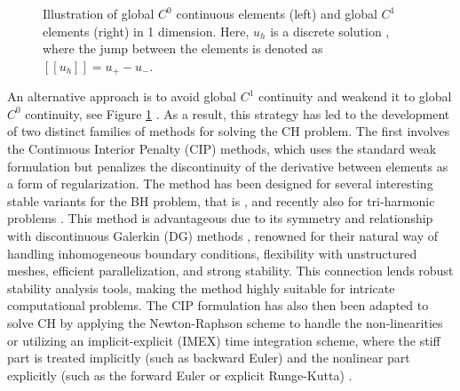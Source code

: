 \documentclass[11pt]{article}
\theoremstyle{remark}
\newcommand{\jump}[1]{\left[\!\left[ #1 \right]\!\right]}
\numberwithin{equation}{section}
\begin{document}
\begin{figure}[h!]
\begin{minipage}{0.45\textwidth}
    \end{minipage}
    \caption{ Illustration of global $C^{0}$ continuous elements (left) and global $C^{1}$ elements (right) in 1 dimension. Here, $u_{h}$ is a discrete solution
, where the jump between the elements is denoted as $ \jump{ u_{h} } = u_{+} - u_{-}$. }
\label{fig:global_C0}
\end{figure}

An alternative approach is to avoid global $C^1$ continuity and weakend it to global $C^{0}$ continuity, see Figure \ref{fig:global_C0} . As a result, this strategy has led to the development of two distinct families of methods for solving the CH problem.
The first involves the Continuous Interior Penalty (CIP) methods, which uses the standard weak formulation but penalizes the discontinuity of the derivative between elements as a form of regularization. The method has been designed for several interesting
stable variants for the BH problem, that is \cite{brenner2012, brenner2012quadratic, brenner2012quadratic_kirk, mu2014weak, georgoulis2009discontinuous}, and recently also for tri-harmonic problems \cite{diegel2023c0}.
This method is advantageous due to its symmetry and relationship with discontinuous Galerkin (DG) methods \cite{di2011mathematical}, renowned for their natural way of handling inhomogeneous boundary conditions, flexibility with unstructured meshes, efficient parallelization, and strong stability. This connection lends robust stability analysis tools, making the method highly suitable for intricate computational problems.
The CIP formulation has also then been adapted to solve CH by applying the Newton-Raphson scheme to handle the non-linearities \cite{wells2006discontinuous} or utilizing an implicit-explicit (IMEX) time integration scheme, where the stiff part is treated implicitly (such as backward Euler) and the nonlinear part explicitly (such as the forward
Euler or explicit Runge-Kutta) \cite{ feng2007fully}.
\end{document}
